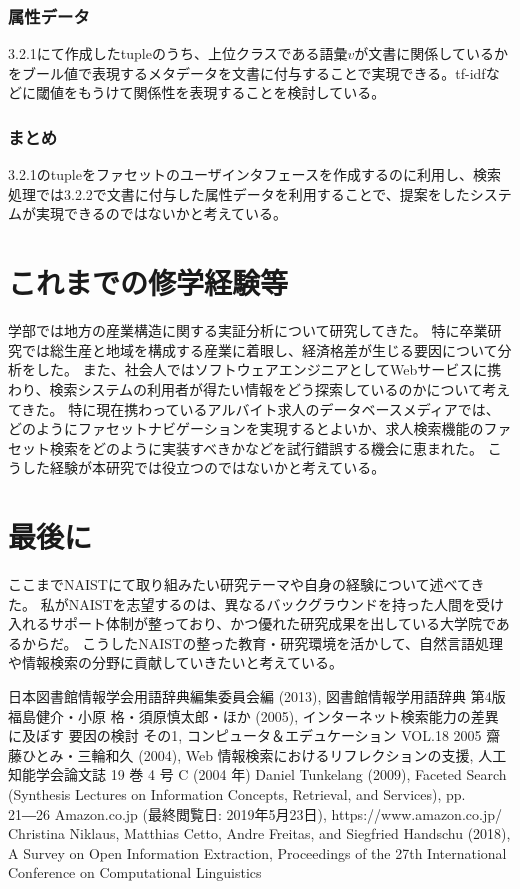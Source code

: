\documentclass[a4j,10pt, twocolumn]{jarticle} \usepackage[dvipdfmx]{graphicx} \usepackage{amssymb} \usepackage{amsmath}
\begin{document}
\subsubsection{属性データ}
 3.2.1にて作成したtupleのうち、上位クラスである語彙$v$が文書に関係しているかをブール値で表現するメタデータを文書に付与することで実現できる。tf-idfなどに閾値をもうけて関係性を表現することを検討している。

\subsubsection{まとめ}
 3.2.1のtupleをファセットのユーザインタフェースを作成するのに利用し、検索処理では3.2.2で文書に付与した属性データを利用することで、提案をしたシステムが実現できるのではないかと考えている。

\section{これまでの修学経験等}
 学部では地方の産業構造に関する実証分析について研究してきた。
 特に卒業研究では総生産と地域を構成する産業に着眼し、経済格差が生じる要因について分析をした。
 また、社会人ではソフトウェアエンジニアとしてWebサービスに携わり、検索システムの利用者が得たい情報をどう探索しているのかについて考えてきた。
 特に現在携わっているアルバイト求人のデータベースメディアでは、どのようにファセットナビゲーションを実現するとよいか、求人検索機能のファセット検索をどのように実装すべきかなどを試行錯誤する機会に恵まれた。
 こうした経験が本研究では役立つのではないかと考えている。

\section{最後に}
ここまでNAISTにて取り組みたい研究テーマや自身の経験について述べてきた。
私がNAISTを志望するのは、異なるバックグラウンドを持った人間を受け入れるサポート体制が整っており、かつ優れた研究成果を出している大学院であるからだ。
こうしたNAISTの整った教育・研究環境を活かして、自然言語処理や情報検索の分野に貢献していきたいと考えている。

\begin{thebibliography}{9}
  日本図書館情報学会用語辞典編集委員会編 (2013), 図書館情報学用語辞典 第4版
   福島健介・小原 格・須原慎太郎・ほか (2005), インターネット検索能力の差異に及ぼす 要因の検討 その1, コンピュータ＆エデュケーション VOL.18 2005
   齋藤ひとみ・三輪和久 (2004),  Web 情報検索におけるリフレクションの支援, 人工知能学会論文誌 19 巻 4 号 C (2004 年)
  Daniel Tunkelang (2009), Faceted Search (Synthesis Lectures on Information Concepts, Retrieval, and Services), pp. 21―26
  Amazon.co.jp (最終閲覧日: 2019年5月23日), https://www.amazon.co.jp/
  Christina Niklaus, Matthias Cetto, Andre Freitas, and Siegfried Handschu (2018), A Survey on Open Information Extraction, Proceedings of the 27th International Conference on Computational Linguistics
\end{thebibliography}
\end{document}
